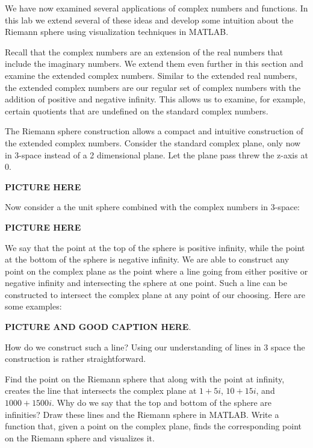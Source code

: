 

We have now examined several applications of complex numbers and functions.  In this lab we extend several of these ideas and develop some intuition about the Riemann sphere using visualization techniques in MATLAB.

Recall that the complex numbers are an extension of the real numbers that include the imaginary numbers.  We extend them even further in this section and examine the extended complex numbers.  Similar to the extended real numbers, the extended complex numbers are our regular set of complex numbers with the addition of positive and negative infinity.  This allows us to examine, for example, certain quotients that are undefined on the standard complex numbers.

The Riemann sphere construction allows a compact and intuitive construction of the extended complex numbers.  Consider the standard complex plane, only now in 3-space instead of a 2 dimensional plane.  Let the plane pass threw the z-axis at $0$.

{\bf PICTURE HERE}

Now consider a the unit sphere combined with the complex numbers in 3-space:

{\bf PICTURE HERE}

We say that the point at the top of the sphere is positive infinity, while the point at the bottom of the sphere is negative infinity.  We are able to construct any point on the complex plane as the point where a line going from either positive or negative infinity and intersecting the sphere at one point.  Such a line can be constructed to intersect the complex plane at any point of our choosing.  Here are some examples:

{\bf PICTURE AND GOOD CAPTION HERE}.

How do we construct such a line?  Using our understanding of lines in 3 space the construction is rather straightforward.

\begin{problem}  Find the point on the Riemann sphere that along with the point at infinity, creates the line that intersects the complex plane at $1 + 5i$, $10 + 15i$, and $1000 + 1500i$.  Why do we say that the top and bottom of the sphere are infinities?  Draw these lines and the Riemann sphere in MATLAB.  Write a function that, given a point on the complex plane, finds the corresponding point on the Riemann sphere and visualizes it.
\end{problem}

